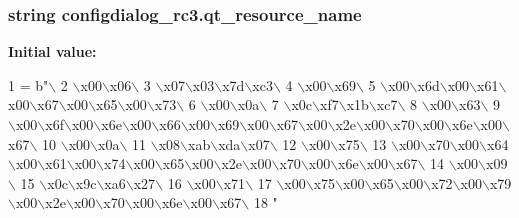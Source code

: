 \subsubsection[{qt\+\_\+resource\+\_\+name}]{\setlength{\rightskip}{0pt plus 5cm}string configdialog\+\_\+rc3.\+qt\+\_\+resource\+\_\+name}\label{namespaceconfigdialog__rc3_ac7fc3f3bf5022deea8c8945bb3458c42}
{\bfseries Initial value\+:}
\begin{DoxyCode}
1 = b\textcolor{stringliteral}{"\(\backslash\)}
2 \textcolor{stringliteral}{\(\backslash\)x00\(\backslash\)x06\(\backslash\)}
3 \textcolor{stringliteral}{\(\backslash\)x07\(\backslash\)x03\(\backslash\)x7d\(\backslash\)xc3\(\backslash\)}
4 \textcolor{stringliteral}{\(\backslash\)x00\(\backslash\)x69\(\backslash\)}
5 \textcolor{stringliteral}{\(\backslash\)x00\(\backslash\)x6d\(\backslash\)x00\(\backslash\)x61\(\backslash\)x00\(\backslash\)x67\(\backslash\)x00\(\backslash\)x65\(\backslash\)x00\(\backslash\)x73\(\backslash\)}
6 \textcolor{stringliteral}{\(\backslash\)x00\(\backslash\)x0a\(\backslash\)}
7 \textcolor{stringliteral}{\(\backslash\)x0c\(\backslash\)xf7\(\backslash\)x1b\(\backslash\)xc7\(\backslash\)}
8 \textcolor{stringliteral}{\(\backslash\)x00\(\backslash\)x63\(\backslash\)}
9 \textcolor{stringliteral}{\(\backslash\)x00\(\backslash\)x6f\(\backslash\)x00\(\backslash\)x6e\(\backslash\)x00\(\backslash\)x66\(\backslash\)x00\(\backslash\)x69\(\backslash\)x00\(\backslash\)x67\(\backslash\)x00\(\backslash\)x2e\(\backslash\)x00\(\backslash\)x70\(\backslash\)x00\(\backslash\)x6e\(\backslash\)x00\(\backslash\)x67\(\backslash\)}
10 \textcolor{stringliteral}{\(\backslash\)x00\(\backslash\)x0a\(\backslash\)}
11 \textcolor{stringliteral}{\(\backslash\)x08\(\backslash\)xab\(\backslash\)xda\(\backslash\)x07\(\backslash\)}
12 \textcolor{stringliteral}{\(\backslash\)x00\(\backslash\)x75\(\backslash\)}
13 \textcolor{stringliteral}{\(\backslash\)x00\(\backslash\)x70\(\backslash\)x00\(\backslash\)x64\(\backslash\)x00\(\backslash\)x61\(\backslash\)x00\(\backslash\)x74\(\backslash\)x00\(\backslash\)x65\(\backslash\)x00\(\backslash\)x2e\(\backslash\)x00\(\backslash\)x70\(\backslash\)x00\(\backslash\)x6e\(\backslash\)x00\(\backslash\)x67\(\backslash\)}
14 \textcolor{stringliteral}{\(\backslash\)x00\(\backslash\)x09\(\backslash\)}
15 \textcolor{stringliteral}{\(\backslash\)x0c\(\backslash\)x9c\(\backslash\)xa6\(\backslash\)x27\(\backslash\)}
16 \textcolor{stringliteral}{\(\backslash\)x00\(\backslash\)x71\(\backslash\)}
17 \textcolor{stringliteral}{\(\backslash\)x00\(\backslash\)x75\(\backslash\)x00\(\backslash\)x65\(\backslash\)x00\(\backslash\)x72\(\backslash\)x00\(\backslash\)x79\(\backslash\)x00\(\backslash\)x2e\(\backslash\)x00\(\backslash\)x70\(\backslash\)x00\(\backslash\)x6e\(\backslash\)x00\(\backslash\)x67\(\backslash\)}
18 \textcolor{stringliteral}{"}
\end{DoxyCode}
\hypertarget{namespaceconfigdialog__rc3_a50ec9551a706019e5bfe82a15a181842}{}

